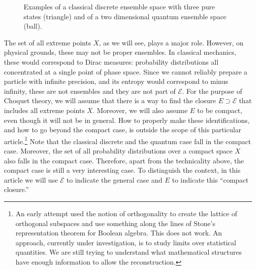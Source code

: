 \documentclass[10pt,twocolumn, nofootinbib]{revtex4-2}
\newcommand{\Ens}[1][E] {\mathcal{#1}} %
\begin{document}
\begin{figure}[H]
	\caption{Examples of a classical discrete ensemble space with three pure states (triangle) and of a two dimensional quantum ensemble space (ball).}
\end{figure}

The set of all extreme points $X$, as we will see, plays a major role. However, on physical grounds, these may not be proper ensembles. In classical mechanics, these would correspond to Dirac measures: probability distributions all concentrated at a single point of phase space. Since we cannot reliably prepare a particle with infinite precision, and its entropy would correspond to minus infinity, these are not ensembles and they are not part of $\Ens$. For the purpose of Choquet theory, we will assume that there is a way to find the closure $E \supset \Ens$ that includes all extreme points $X$. Moreover, we will also assume $E$ to be compact, even though it will not be in general. How to properly make these identifications, and how to go beyond the compact case, is outside the scope of this particular article.\footnote{An early attempt used the notion of orthogonality to create the lattice of orthogonal subspaces and use something along the lines of Stone's representation theorem for Boolean algebra. This does not work. An approach, currently under investigation, is to study limits over statistical quantities. We are still trying to understand what mathematical structures have enough information to allow the reconstruction.} Note that the classical discrete and the quantum case fall in the compact case. Moreover, the set of all probability distributions over a compact space $X$ also falls in the compact case. Therefore, apart from the technicality above, the compact case is still a very interesting case. To distinguish the context, in this article we will use $\Ens$ to indicate the general case and $E$ to indicate this ``compact closure.''
\end{document}
